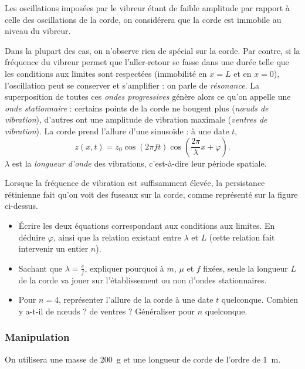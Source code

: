 \documentclass[]{tp}
\begin{document}
Les oscillations imposées par le vibreur étant de faible amplitude par rapport à celle des oscillations de la corde, on considérera que la corde est immobile au niveau du vibreur.

Dans la plupart des cas, on n'observe rien de spécial sur la corde. Par contre, si la fréquence du vibreur permet que l'aller-retour se fasse dans une durée telle que les conditions aux limites sont respectées (immobilité en $x=L$ et en $x=0$), l'oscillation peut se conserver et s'amplifier : on parle de \emph{résonance}. La superposition de toutes ces \emph{ondes progressives} génère alors ce qu'on appelle une \emph{onde stationnaire} : certains points de la corde ne bougent plus (\emph{n\oe{}uds de vibration}), d'autres ont une amplitude de vibration maximale (\emph{ventres de vibration}). La corde prend l'allure d'une sinusoïde : à une date $t$, 
%
\[z(x,t) = z_0\cos\left(2\pi f t\right) \cos\left(\frac{2\pi}{\lambda} x + \varphi \right).\] 
%
$\lambda$ est la \emph{longueur d'onde} des vibrations, c'est-à-dire leur période spatiale.

Lorsque la fréquence de vibration est suffisamment élevée, la persistance rétinienne fait qu'on voit des fuseaux sur la corde, comme représenté sur la figure ci-dessus.

\begin{itemize}
  \item Écrire les deux équations correspondant aux conditions aux limites. En déduire $\varphi$, ainsi que la relation existant entre $\lambda$ et $L$ (cette relation fait intervenir un entier $n$).

  \item Sachant que $\lambda = \frac{c}{f}$, expliquer pourquoi à $m$, $\mu$ et $f$ fixées, seule la longueur $L$ de la corde va jouer sur l'établissement ou non d'ondes stationnaires.

  \item Pour $n = 4$, représenter l'allure de la corde à une date $t$ quelconque. Combien y a-t-il de n\oe{}uds ? de ventres ? Généraliser pour $n$ quelconque.

\end{itemize}


\subsubsection{Manipulation}%
\label{ssub:manipulation}
On utilisera une masse de \SI{200}{g} et une longueur de corde de l'ordre de \SI{1}{m}. 
\end{document}
